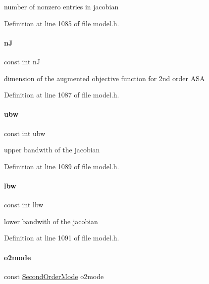 number of nonzero entries in jacobian 

Definition at line 1085 of file model.\+h.

\mbox{\label{classamici_1_1_model_a0d2f49d2b15b08628451261e52f56e4f}} 
\paragraph{\texorpdfstring{nJ}{nJ}}
{\footnotesize\ttfamily const int nJ}

dimension of the augmented objective function for 2nd order A\+SA 

Definition at line 1087 of file model.\+h.

\mbox{\label{classamici_1_1_model_a8aac2b651892bb766a3cb79868944d81}} 
\paragraph{\texorpdfstring{ubw}{ubw}}
{\footnotesize\ttfamily const int ubw}

upper bandwith of the jacobian 

Definition at line 1089 of file model.\+h.

\mbox{\label{classamici_1_1_model_aa19cd03fcaffb7a0cebd666081c5a868}} 
\paragraph{\texorpdfstring{lbw}{lbw}}
{\footnotesize\ttfamily const int lbw}

lower bandwith of the jacobian 

Definition at line 1091 of file model.\+h.

\mbox{\label{classamici_1_1_model_acc235cad50283f7891e2d834f1cbeb90}} 
\paragraph{\texorpdfstring{o2mode}{o2mode}}
{\footnotesize\ttfamily const \mbox{\hyperlink{namespaceamici_a2d77779286167d5603a870bf9f6c21ba}{Second\+Order\+Mode}} o2mode}


